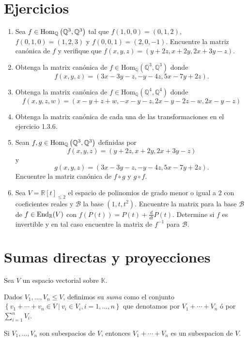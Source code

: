 \section*{Ejercicios}
\begin{enumerate}
  \item Sea $f\in\operatorname{Hom}_{\mathbb{Q}}\left(\mathbb{Q}^3,\mathbb{Q}^3\right)$ tal que $f(1,0,0)=(0,1,2)$, $f(0,1,0)=(1,2,3)$ y $f(0,0,1)=(2,0,-1)$. Encuentre la matriz canónica de $f$ y verifique que $f(x,y,z)=(y+2z,x+2y,2x+3y-z)$.
  \item Obtenga la matrix canónica de $f\in\textrm{Hom}_{\mathbb{Q}}(\mathbb{Q}^3,\mathbb{Q}^3)$ donde
$$f(x,y,z)=(3x-3y-z,-y-4z,5x-7y+2z).$$
  \item Obtenga la matrix canónica de $f\in\textrm{Hom}_{\mathbb{Q}}(\mathbb{Q}^4,\mathbb{Q}^4)$ donde
$$f(x,y,z,w)=(x-y+z+w,-x-y-z,2x-y-2z-w,2x-y-z)$$
  \item Obtenga la matrix canónica de cada una de las transformaciones en el ejercicio 1.3.6.
  \item Sean $f,g\in\operatorname{Hom}_{\mathbb{Q}}\left(\mathbb{Q}^3,\mathbb{Q}^3\right)$ definidas por
  $$f(x,y,z)=(y+2z,x+2y,2x+3y-z)$$
  y
  $$g(x,y,z)=(3x-3y-z,-y-4z,5x-7y+2z).$$
  Encuentre la matriz canónica de $f\circ g$ y $g\circ f$.
  \item Sea $V=\mathbb{R}[t]_{\le 2}$ el espacio de polinomios de grado menor o igual a $2$ con coeficientes reales y $\mathcal{B}$ la base $(1,t,t^2)$. Encuentre la matrix para la base $\mathcal{B}$ de $f\in\operatorname{End}_{\mathbb{R}}(V)$ con $f(P(t))=P(t)+\frac{d}{dt}P(t)$. Determine si $f$ es invertible y en tal caso encuentre la matrix de $f^{-1}$ para $\mathcal{B}$.
\end{enumerate}

\section{Sumas directas y proyecciones}

Sea $V$ un espacio vectorial sobre $\mathbb{K}$.

\begin{defn}
Dados $V_1,\ldots,V_n\le V$, definimos su \emph{suma} como el conjunto $\left\{v_1+\cdots+v_n\in V\ |\ v_i\in V_i, i=1,\ldots,n \right\}$ que denotamos por $V_1+\cdots+V_n$ \'o por $\sum_{i=1}^n V_i$.
\end{defn}

\begin{prop}
Si $V_1,\ldots,V_n$ son subespacios de $V$, entonces $V_1+\cdots+V_n$ es un subespacion de $V$.
\end{prop}

